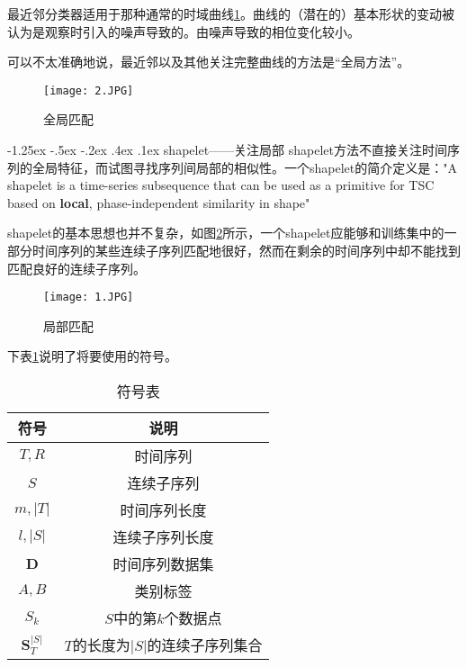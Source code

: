﻿\documentclass[a4paper, 11pt]{article}
\makeatletter
\newcommand{\xiaosihao}{\fontsize{12pt}{\baselineskip}\selectfont}
\renewcommand\subsection{\@startsection{subsection}{1}{\z@}%
{-1.25ex \@plus -.5ex \@minus -.2ex}%
{.4ex \@plus .1ex}%
{\normalfont\xiaosihao\CJKfamily{hei}}}
\makeatother
\begin{document}
\begin{CJK}{UTF8}{gbsn}
最近邻分类器适用于那种通常的时域曲线\ref{fig:fig1}。曲线的（潜在的）基本形状的变动被认为是观察时引入的噪声导致的。由噪声导致的相位变化较小。\par

可以不太准确地说，最近邻以及其他关注完整曲线的方法是“全局方法”。\par

\begin{figure}[htbp]
    \small
    \centering
    \texttt{[image: 2.JPG]}
    \label{fig:fig1}
    \caption{全局匹配\cite{Hills}}
\end{figure}

\subsection{shapelet——关注局部}
shapelet方法不直接关注时间序列的全局特征，而试图寻找序列间局部的相似性。一个shapelet的简介定义是："A shapelet is a time-series subsequence that can be used as a primitive for TSC based on \textbf{local}, phase-independent similarity in shape"\cite{Hills}\par

shapelet的基本思想也并不复杂，如图\ref{fig:fig2}所示，一个shapelet应能够和训练集中的一部分时间序列的某些连续子序列匹配地很好，然而在剩余的时间序列中却不能找到匹配良好的连续子序列。\par

\begin{figure}[htbp]
    \small
    \centering
    \texttt{[image: 1.JPG]}\\
    \label{fig:fig2}
    \caption{局部匹配\cite{Lexiang}}
\end{figure}

下表\ref{tab:symbolTable}说明了将要使用的符号。\par

\begin{table}[htbp]
    \centering
    \caption{符号表}
        \label{tab:symbolTable}
    \begin{tabular}{cc}
        \toprule
        符号 & 说明 \\
        \midrule
        $T, R$  &   时间序列\\
        $S$     &   连续子序列\\
        $m, |T|$    &   时间序列长度\\
        $l, |S|$    &   连续子序列长度\\
        $\mathbf{D}$    &   时间序列数据集\\
        $A, B$  &   类别标签\\
        $S_{{k}}$   &   $S$中的第$k$个数据点\\
        $\mathbf{S}_{T}^{|S|}$  &   $T$的长度为$|S|$的连续子序列集合\\
        \bottomrule
    \end{tabular}
\end{table}


\end{CJK}
\end{document}
